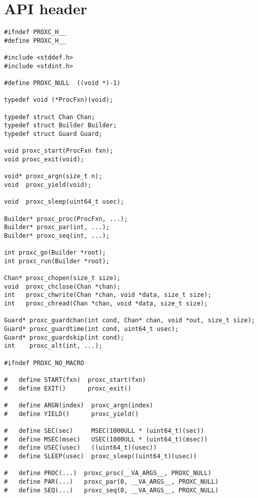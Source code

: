 
\chapter{API header}
\label{ch:api_header}

\begin{lstlisting}[style=CustomC,caption={API header file for ProXC},label={lst:api_header_file_proxc}]
#ifndef PROXC_H__
#define PROXC_H__

#include <stddef.h>
#include <stdint.h>

#define PROXC_NULL  ((void *)-1)

typedef void (*ProcFxn)(void);

typedef struct Chan Chan;
typedef struct Builder Builder;
typedef struct Guard Guard;

void proxc_start(ProcFxn fxn);
void proxc_exit(void);

void* proxc_argn(size_t n);
void  proxc_yield(void);

void  proxc_sleep(uint64_t usec);

Builder* proxc_proc(ProcFxn, ...);
Builder* proxc_par(int, ...);
Builder* proxc_seq(int, ...);

int proxc_go(Builder *root);
int proxc_run(Builder *root);

Chan* proxc_chopen(size_t size);
void  proxc_chclose(Chan *chan);
int   proxc_chwrite(Chan *chan, void *data, size_t size);
int   proxc_chread(Chan *chan, void *data, size_t size);

Guard* proxc_guardchan(int cond, Chan* chan, void *out, size_t size);
Guard* proxc_guardtime(int cond, uint64_t usec);
Guard* proxc_guardskip(int cond);
int    proxc_alt(int, ...);

#ifndef PROXC_NO_MACRO

#   define START(fxn)  proxc_start(fxn)
#   define EXIT()      proxc_exit()

#   define ARGN(index)  proxc_argn(index)
#   define YIELD()      proxc_yield()

#   define SEC(sec)     MSEC(1000ULL * (uint64_t)(sec))
#   define MSEC(msec)   USEC(1000ULL * (uint64_t)(msec))
#   define USEC(usec)   ((uint64_t)(usec))
#   define SLEEP(usec)  proxc_sleep((uint64_t)(usec))

#   define PROC(...)  proxc_proc(__VA_ARGS__, PROXC_NULL)
#   define PAR(...)   proxc_par(0, __VA_ARGS__, PROXC_NULL)
#   define SEQ(...)   proxc_seq(0, __VA_ARGS__, PROXC_NULL)


\end{lstlisting}
